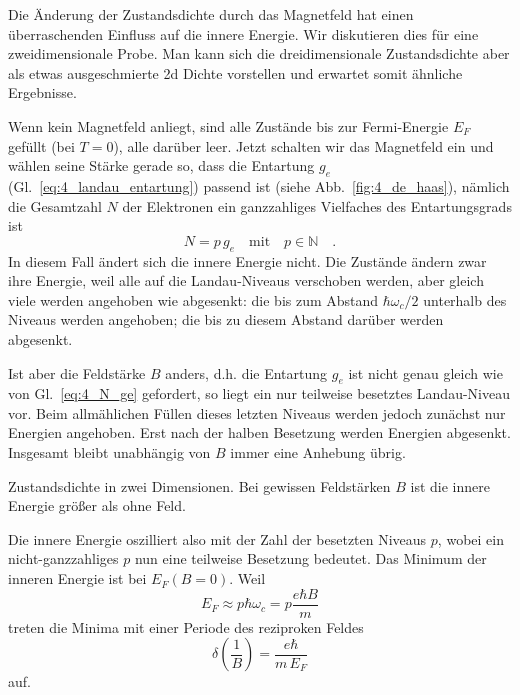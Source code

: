Die Änderung der Zustandsdichte durch das Magnetfeld hat einen überraschenden Einfluss auf die innere Energie. Wir diskutieren dies  für eine zweidimensionale Probe. Man kann sich die dreidimensionale Zustandsdichte aber als etwas ausgeschmierte 2d Dichte vorstellen und erwartet somit ähnliche Ergebnisse.

Wenn kein Magnetfeld anliegt, sind alle Zustände bis zur Fermi-Energie $E_F$ gefüllt (bei $T=0$), alle darüber leer. Jetzt schalten wir das Magnetfeld ein und wählen seine Stärke gerade so, dass die Entartung $g_e$ (Gl.~\ref{eq:4_landau_entartung}) passend ist (siehe Abb.~\ref{fig:4_de_haas}), nämlich  die Gesamtzahl $N$ der Elektronen ein ganzzahliges Vielfaches des Entartungsgrads ist
\begin{equation}
   N = p \, g_e \quad \text{mit} \quad p \in \mathbb{N}  \quad . \label{eq:4_N_ge}
\end{equation}
In diesem Fall ändert sich die innere Energie nicht. Die Zustände ändern zwar ihre Energie, weil alle auf die Landau-Niveaus verschoben  werden, aber gleich viele werden angehoben wie abgesenkt: die bis zum Abstand $\hbar \omega_c/2$ unterhalb des Niveaus werden angehoben; die bis zu diesem Abstand darüber werden abgesenkt.

Ist aber die Feldstärke $B$ anders, d.h. die Entartung $g_e$ ist nicht genau gleich wie von Gl.~\ref{eq:4_N_ge} gefordert, so liegt ein nur teilweise besetztes Landau-Niveau vor. Beim allmählichen Füllen dieses letzten Niveaus werden jedoch zunächst nur Energien angehoben. Erst nach der halben Besetzung werden Energien abgesenkt. Insgesamt bleibt unabhängig von $B$ immer eine Anhebung übrig.

\begin{marginfigure}
   \caption{Zustandsdichte in zwei Dimensionen. Bei gewissen Feldstärken $B$ ist die innere Energie größer als ohne Feld. \label{fig:4_de_haas} }
\end{marginfigure}



Die innere Energie oszilliert also mit der Zahl der besetzten Niveaus $p$, wobei ein nicht-ganzzahliges $p$ nun eine teilweise Besetzung bedeutet. Das Minimum der inneren Energie ist bei $E_F(B=0)$.
Weil
\begin{equation}
   E_F \approx p \hbar \omega_c = p \frac{e \hbar B}{m} 
\end{equation}
treten die Minima mit einer Periode des reziproken Feldes   
\begin{equation}
   \delta \left(\frac{1}{B}  \right) = \frac{e \hbar }{m \, E_F}
\end{equation}
auf.


